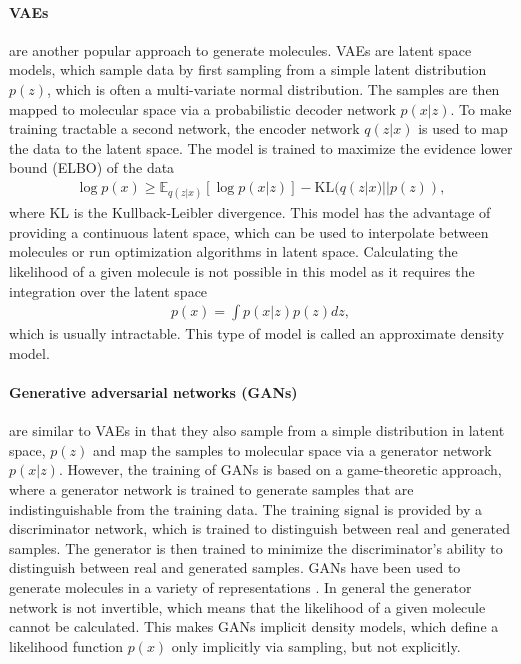\paragraph{\Acp{VAE}} are another popular approach to
generate molecules. \Acp{VAE} are latent space models, which sample 
data by first sampling from a simple latent distribution $p(z)$, which is often 
a multi-variate normal distribution. The samples are then mapped to 
molecular space via a probabilistic decoder network $p(x|z)$.
To make training tractable a second network, the encoder network $q(z|x)$ is
used to map the data to the latent space. The model is trained to maximize
the evidence lower bound (ELBO) of the data
\begin{align}
    \log p(x) \geq \mathbb{E}_{q(z|x)}[\log p(x|z)] - \text{KL}(q(z|x) || p(z)), 
\end{align}
where KL is the Kullback-Leibler divergence. 
This model has the advantage of providing a continuous latent space, which can
be used to interpolate between molecules or run optimization algorithms in
latent space. Calculating the likelihood of a given molecule is not possible
in this model as it requires the integration over the latent space
\begin{align}
    p(x) = \int p(x|z) p(z) dz,
\end{align}
which is usually intractable. This type of model is called an approximate density model. 

\paragraph{Generative adversarial networks (GANs)} are similar to VAEs in that
they also sample from a simple distribution in latent space, $p(z)$ and map the samples to 
molecular space via a generator network $p(x|z)$.
However, the training of GANs is based on a game-theoretic approach, where a
generator network is trained to generate samples that are indistinguishable from
the training data. The training signal is provided by a discriminator network,
which is trained to distinguish between real and generated samples. The generator
is then trained to minimize the discriminator's ability to distinguish between
real and generated samples. GANs have been used to generate molecules 
in a variety of representations \citep{todo}. In general the generator network
is not invertible, which means that the likelihood of a given molecule cannot
be calculated. This makes GANs implicit density models, which define a 
likelihood function $p(x)$ only implicitly via sampling, but not explicitly.

